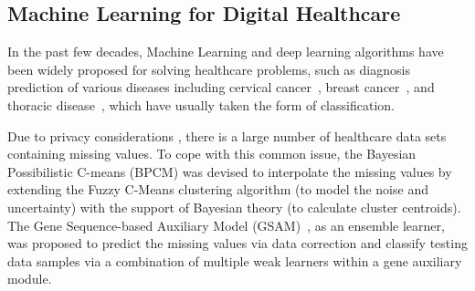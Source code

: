 \documentclass{article}
\newcommand*{\1}{\textcolor{magenta}}
\begin{document}
\begin{comment}
	\end{equation}
	where $DF$ is a distance factor defined to measure the distance between the given two fuzzy sets, and is computed as:
	\begin{equation}\label{dfcalculation}
	DF = 1 - \frac{1}{1+e^{-c d +5}}\ ,
	\end{equation}
	where $c$ denotes the sensitivity factor, and $d$ represents the Euclidean distance between the two fuzzy sets. $c$ is a positive-real number s.t. $c \in \mathbb{R}^{+}$. Smaller value of $c$ yields a similarity degree which is more sensitive to the distance of two fuzzy sets, and vice versa. \\
	\textbf{Step 2}: Determine the firing degree $\alpha$ of each rule by aggregating the matching degrees between a given input and its antecedent terms via:
	\begin{equation}\label{alphaI}
	\alpha_i = \mathcal{S}(A_1^*, A_1^i) \wedge \mathcal{S}(A_2^*, A_2^i) \wedge \cdots \wedge \mathcal{S}(A_m^*, A_m^i)\ ,
	\end{equation}
	where $\wedge$ is a t-norm operator and is implemented as a minimum operator. \\
	\textbf{Step 3}: Calculate the final output $z$ by integrating the sub-consequences from all the rules by:
	\begin{equation}\label{resultTSK}
	z=\frac{\sum_{i=1}^{n}\alpha_i \cdot f_n(x_1,\cdots,x_m)}{\sum_{i=1}^{n}\alpha_i}.
\end{equation}
	\end{comment}
	
	\subsection{Machine Learning for Digital Healthcare}
	In the past few decades, Machine Learning and deep learning algorithms have been widely proposed for solving healthcare problems, such as diagnosis prediction of various diseases including cervical cancer~\cite{ghoneim2020cervical}, breast cancer~\cite{devarriya2020unbalanced}, and thoracic disease~\cite{li2018thoracic}, which have usually taken the form of classification.
	
	Due to privacy considerations \cite{el2015anonymising,thompson2020ethical,chang2021ethical}, there is a large number of healthcare data sets containing missing values. To cope with this common issue, the Bayesian Possibilistic C-means (BPCM) \cite{li2019bayesian} was devised to interpolate the missing values by extending the Fuzzy C-Means clustering algorithm (to model the noise and uncertainty) with the support of Bayesian theory (to calculate cluster centroids). The Gene Sequence-based Auxiliary Model (GSAM)~\cite{lu2020machine}, as an ensemble learner, was proposed to predict the missing values via data correction and classify testing data samples via a combination of multiple weak learners within a gene auxiliary module.
	
\end{document}
